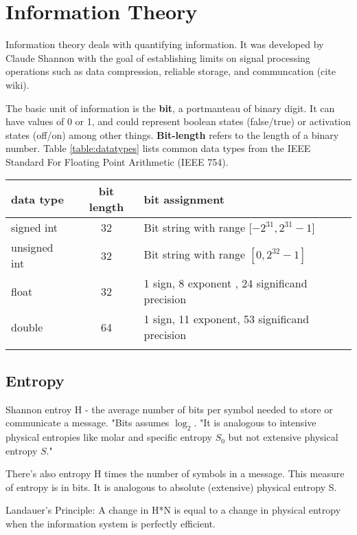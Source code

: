 \section{Information Theory}

Information theory deals with quantifying information. It was developed by Claude Shannon with the goal of establishing limits on signal processing operations such as data compression, reliable storage, and communcation (cite wiki). 

The basic unit of information is the \textbf{bit}, a portmanteau of binary digit. It can have values of 0 or 1, and could represent boolean states (false/true) or activation states (off/on) among other things. \textbf{Bit-length} refers to the length of a binary number. Table \ref{table:datatypes} lists common data types from the IEEE Standard For Floating Point Arithmetic (IEEE 754). 

\begin{tabular}{ l | c | l }
data type & bit length & bit assignment \\
\hline
signed int & 32 & Bit string with range [$-2^{31}, 2^{31}-1]$ \\
unsigned int & 32 & Bit string with range $[0, 2^{32}-1]$ \\
float & 32 & 1 sign, 8 exponent , 24 significand precision \\
double & 64 & 1 sign, 11 exponent, 53 significand precision \\ 
\label{table:datatypes}
\end{tabular}

\subsection{Entropy}

Shannon entroy H - the average number of bits per symbol needed to store or communicate a message. "Bits assumes $\log_{2}$. "It is analogous to intensive physical entropies like molar and specific entropy $S_{0}$ but not extensive physical entropy $S$."

There's also entropy H times the number of symbols in a message. This measure of entropy is in bits. It is analogous to absolute (extensive) physical entropy S. 

Landauer's Principle: A change in H*N is equal to a change in physical entropy when the information system is perfectly efficient. 

